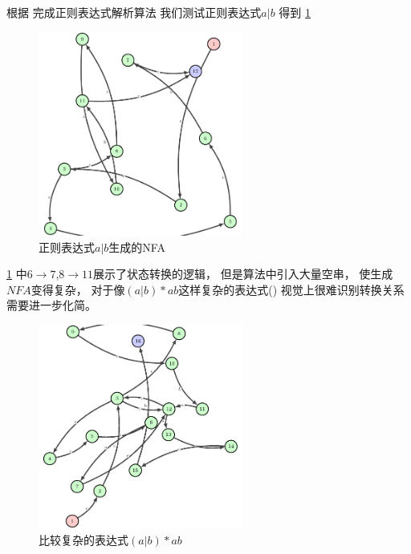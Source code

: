 \documentclass[../report]{subfiles}
\begin{document}
根据
完成正则表达式解析算法
我们测试正则表达式$a|b$
得到%
\cref{fig:ab}
\begin{figure}[H]
  \centering
  \includegraphics[width = 0.6\textwidth]{a|b}
  \caption{正则表达式$a|b$生成的NFA}
  \label{fig:ab}
\end{figure}

\cref{fig:ab}
中$6 \to 7$,$8 \to 11$展示了状态转换的逻辑，
但是算法中引入大量空串，
使生成$NFA$变得复杂，
对于像$(a|b)*ab$这样复杂的表达式()
视觉上很难识别转换关系
需要进一步化简。

\begin{figure}[H]
  \centering
  \includegraphics[width = 0.6\textwidth]{complex}
  \caption{比较复杂的表达式$(a|b)*ab$}
  \label{fig:complex}
\end{figure}
\end{document}

